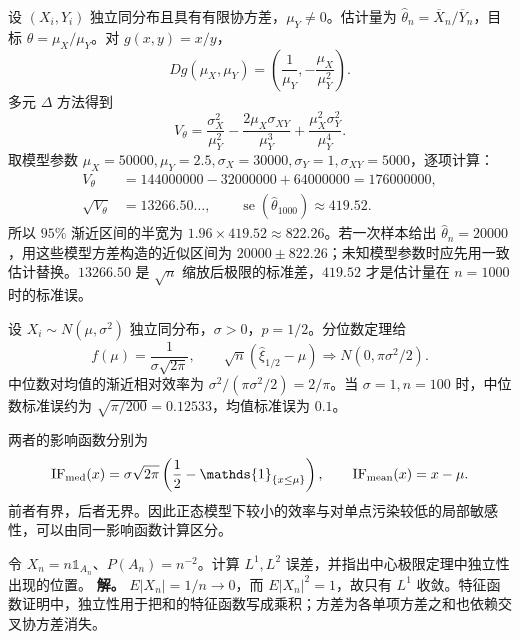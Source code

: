 \begin{exbox}[成对观测的比值估计]
设 $(X_i,Y_i)$ 独立同分布且具有有限协方差，$\mu_Y\ne0$。估计量为 $\widehat\theta_n=\overline X_n/\overline Y_n$，目标 $\theta=\mu_X/\mu_Y$。对 $g(x,y)=x/y$，
\[
 Dg(\mu_X,\mu_Y)=\left(\frac1{\mu_Y},-\frac{\mu_X}{\mu_Y^2}\right).
\]
多元 $\Delta$ 方法得到
\[
 V_\theta=\frac{\sigma_X^2}{\mu_Y^2}
 -\frac{2\mu_X\sigma_{XY}}{\mu_Y^3}
 +\frac{\mu_X^2\sigma_Y^2}{\mu_Y^4}.
\]
取模型参数 $\mu_X=50000,\mu_Y=2.5,\sigma_X=30000,\sigma_Y=1,\sigma_{XY}=5000$，逐项计算：
\begin{align*}
 V_\theta&=144000000-32000000+64000000=176000000,\\
 \sqrt{V_\theta}&=13266.50\ldots,\qquad
 \operatorname{se}(\widehat\theta_{1000})\approx419.52.
\end{align*}
所以 $95\%$ 渐近区间的半宽为 $1.96\times419.52\approx822.26$。若一次样本给出 $\widehat\theta_n=20000$，用这些模型方差构造的近似区间为 $20000\pm822.26$；未知模型参数时应先用一致估计替换。$13266.50$ 是 $\sqrt n$ 缩放后极限的标准差，$419.52$ 才是估计量在 $n=1000$ 时的标准误。
\end{exbox}

\begin{exbox}[正态中位数与均值的效率]
设 $X_i\sim N(\mu,\sigma^2)$ 独立同分布，$\sigma>0$，$p=1/2$。分位数定理给
\[
 f(\mu)=\frac1{\sigma\sqrt{2\pi}},\qquad
 \sqrt n(\widehat\xi_{1/2}-\mu)\Rightarrow N(0,\pi\sigma^2/2).
\]
中位数对均值的渐近相对效率为 $\sigma^2/(\pi\sigma^2/2)=2/\pi$。当 $\sigma=1,n=100$ 时，中位数标准误约为 $\sqrt{\pi/200}=0.12533$，均值标准误为 $0.1$。

两者的影响函数分别为
\[
 \mathrm{IF}_{\rm med}(x)=\sigma\sqrt{2\pi}\left(\frac12-\mathds{1}_{\{x\le\mu\}}\right),
 \qquad \mathrm{IF}_{\rm mean}(x)=x-\mu.
\]
前者有界，后者无界。因此正态模型下较小的效率与对单点污染较低的局部敏感性，可以由同一影响函数计算区分。
\end{exbox}


\begin{workedexample}
令 $X_n=n\mathds{1}_{A_n}$、$P(A_n)=n^{-2}$。计算 $L^1,L^2$ 误差，并指出中心极限定理中独立性出现的位置。
\textbf{解。} $E|X_n|=1/n\to0$，而 $E|X_n|^2=1$，故只有 $L^1$ 收敛。特征函数证明中，独立性用于把和的特征函数写成乘积；方差为各单项方差之和也依赖交叉协方差消失。
\end{workedexample}

